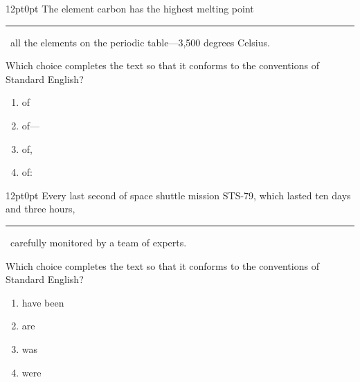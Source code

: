 \documentclass[11pt, twocolumn]{article}
\newcounter{questionnum}
\begin{document}
\vspace{6pt}\noindent
\begin{minipage}{\columnwidth}\raggedright
\noindent{}\par\vspace{8pt}
\begin{adjustwidth}{12pt}{0pt}
The element carbon has the highest melting point \,\rule{2cm}{0.4pt}\, all the elements on the periodic table---3,500 degrees Celsius.
\vspace{6pt}

Which choice completes the text so that it conforms to the conventions of Standard English?
\begin{enumerate}[label=\Alph*),leftmargin=18pt,topsep=3pt,itemsep=2pt]
  \item of
  \item of---
  \item of,
  \item of:
\end{enumerate}
\end{adjustwidth}
\end{minipage}\par

\vspace{6pt}\noindent
\begin{minipage}{\columnwidth}\raggedright
\noindent{}\par\vspace{8pt}
\begin{adjustwidth}{12pt}{0pt}
Every last second of space shuttle mission STS-79, which lasted ten days and three hours, \,\rule{2cm}{0.4pt}\, carefully monitored by a team of experts.
\vspace{6pt}

Which choice completes the text so that it conforms to the conventions of Standard English?
\begin{enumerate}[label=\Alph*),leftmargin=18pt,topsep=3pt,itemsep=2pt]
  \item have been
  \item are
  \item was
  \item were
\end{enumerate}
\end{adjustwidth}
\end{minipage}\par
\end{document}
